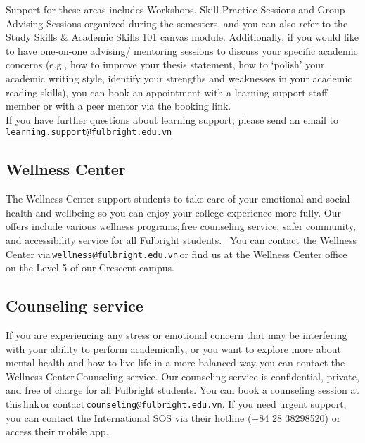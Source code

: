 \documentclass[
]{article}
\begin{document}
Support for these areas includes Workshops, Skill Practice Sessions and Group Advising Sessions organized during the semesters, and you can also refer to the Study Skills \& Academic Skills 101 canvas module. Additionally, if you would like to have one-on-one advising/ mentoring sessions to discuss your specific academic concerns (e.g., how to improve your thesis statement, how to `polish' your academic writing style, identify your strengths and weaknesses in your academic reading skills), you can book an appointment with a learning support staff member or with a peer mentor via the booking link.\\
If you have further questions about learning support, please send an email to \href{mailto:learning.support@fulbright.edu.vn}{\nolinkurl{learning.support@fulbright.edu.vn}}

\subsection*{Wellness Center}\label{wellness-center}

The Wellness Center support students to take care of your emotional and social health and wellbeing so you can enjoy your college experience more fully. Our offers include various wellness programs,\,free counseling service, safer community, and accessibility service for all Fulbright students.
\,
You can contact the Wellness Center via\,\href{mailto:wellness@fulbright.edu.vn}{\nolinkurl{wellness@fulbright.edu.vn}}\,or find us at the Wellness Center office on the Level 5 of our Crescent campus.

\subsection*{Counseling service}\label{counseling-service}

If you are experiencing any stress or emotional concern that may be interfering with your ability to perform academically, or you want to explore more about mental health and how to live life in a more balanced way,\,you can contact the Wellness Center\,Counseling service.
Our counseling service is confidential, private, and free of charge for all Fulbright students. You can book a counseling session at this\,link\,or contact\,\href{mailto:counseling@fulbright.edu.vn}{\nolinkurl{counseling@fulbright.edu.vn}}. If you need urgent support, you can contact the International SOS via their hotline (+84 28 38298520) or access their mobile app.
\end{document}
